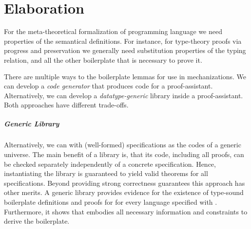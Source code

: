 \chapter{Elaboration}\label{ch:elaboration}
For the meta-theoretical formalization of programming language we need
properties of the semantical definitions. For instance, for type-theory proofs
via progress and preservation we generally need substitution properties of the
typing relation, and all the other boilerplate that is necessary to prove it.

There are multiple ways to the boilerplate lemmas for use in mechanizations. We
can develop a \emph{code generator} that produces code for a proof-assistant.
Alternatively, we can develop a \emph{datatype-generic} library inside a
proof-assistant. Both approaches have different trade-offs.


\paragraph{Generic Library}

Alternatively, we can with (well-formed) \Knot specifications as the codes of a
generic universe. The main benefit of a library is, that its code, including all
proofs, can be checked separately independently of a concrete specification.
Hence, instantiating the library is guaranteed to yield valid theorems for all
specifications. Beyond providing strong correctness guarantees this approach has
other merits. A generic library provides evidence for the existence of
type-sound boilerplate definitions and proofs for for every language specified
with \Knot. Furthermore, it shows that \Knot embodies all necessary information
and constraints to derive the boilerplate.

